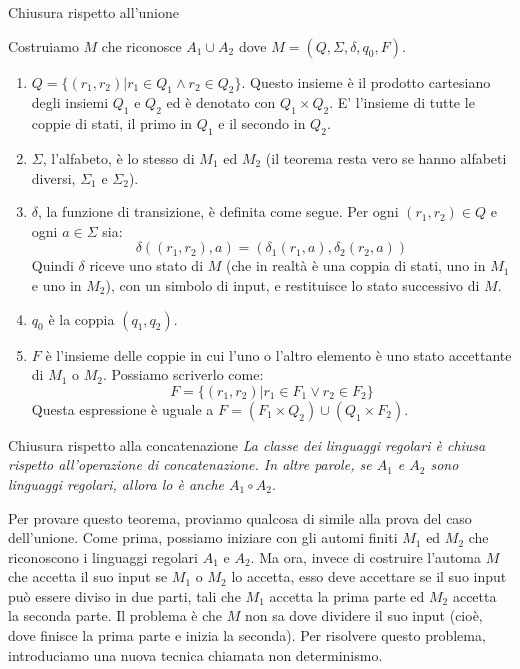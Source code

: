 \begin{Thm}{Chiusura rispetto all'unione}{}
\begin{demonstration}
    Costruiamo $M$ che riconosce $A_{1}\cup A_{2}$ dove $M = (Q, \Sigma, \delta, q_{0}, F)$.
    \begin{enumerate}
        \item $Q=\{(r_{1}, r_{2})| r_1 \in Q_1 \land r_{2} \in Q_{2}\}$. Questo insieme è il prodotto cartesiano degli insiemi $Q_{1}$ e $Q_{2}$ ed è denotato con $Q_{1}\times Q_{2}$. E' l'insieme di tutte le coppie di stati, il primo in $Q_{1}$ e il secondo in $Q_{2}$.
        \item $\Sigma$, l'alfabeto, è lo stesso di $M_{1}$ ed $M_{2}$ (il teorema resta vero se hanno alfabeti diversi, $\Sigma_{1}$ e $\Sigma_{2}$).
        \item $\delta$, la funzione di transizione, è definita come segue. Per ogni $(r_{1}, r_{2}) \in Q$ e ogni $a \in \Sigma$ sia:
        \begin{equation*}
        \delta((r_{1}, r_{2}), a) = (\delta_{1}(r_{1}, a), \delta_{2}(r_{2}, a))        
        \end{equation*}
        Quindi $\delta$ riceve uno stato di $M$ (che in realtà è una coppia di stati, uno in $M_{1}$ e uno in $M_{2}$), con un simbolo di input, e restituisce lo stato successivo di $M$.
        \item $q_0$ è la coppia $(q_{1}, q_{2})$.
        \item $F$ è l'insieme delle coppie in cui l'uno o l'altro elemento è uno stato accettante di $M_{1}$ o $M_{2}$. Possiamo scriverlo come:
        \begin{equation*}
        F=\{(r_{1}, r_{2})|r_1 \in F_1 \lor r_2 \in F_2 \}
        \end{equation*}
        Questa espressione è uguale a $F=(F_{1}\times Q_{2})\cup(Q_1\times F_2)$.
    \end{enumerate}
    \end{demonstration}
\end{Thm}

\begin{Thm}{Chiusura rispetto alla concatenazione}{}
\textit{La classe dei linguaggi regolari è chiusa rispetto all'operazione di concatenazione. In altre parole, se $A_1$ e $A_2$ sono linguaggi regolari, allora lo è anche $A_1\circ A_2$.}

Per provare questo teorema, proviamo qualcosa di simile alla prova del caso dell'unione. Come prima, possiamo iniziare con gli automi finiti $M_1$ ed $M_2$ che riconoscono i linguaggi regolari $A_1$ e $A_2$. Ma ora, invece di costruire l'automa $M$ che accetta il suo input se $M_1$ o $M_2$ lo accetta, esso deve accettare se il suo input può essere diviso in due parti, tali che $M_1$ accetta la prima parte ed $M_2$ accetta la seconda parte. Il problema è che $M$ non sa dove dividere il suo input (cioè, dove finisce la prima parte e inizia la seconda). Per risolvere questo problema, introduciamo una nuova tecnica chiamata non determinismo.
\end{Thm}

